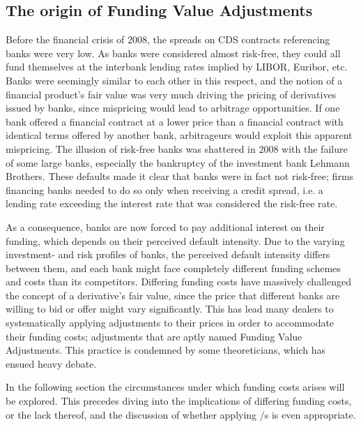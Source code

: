 \documentclass[main.tex]{subfiles}
\begin{document}
    \subsection{The origin of Funding Value Adjustments}
        Before the financial crisis of 2008, the spreads on CDS contracts referencing banks were very low. 
        As banks were considered almost risk-free, 
        they could all fund themselves at the interbank lending rates implied by LIBOR, Euribor, etc.
        Banks were seemingly similar to each other in this respect, 
        and the notion of a financial product's fair value was very much driving the pricing of derivatives issued by banks,
        since mispricing would lead to arbitrage opportunities.
        If one bank offered a financial contract at a lower price than a financial contract with identical terms
        offered by another bank, arbitrageurs would exploit this apparent mispricing. 
        The illusion of risk-free banks was shattered in 2008 with the failure of some large banks, 
        especially the bankruptcy of the investment bank Lehmann Brothers.
        These defaults made it clear that banks were in fact not risk-free; 
        firms financing banks needed to do so only when receiving a credit spread,
        i.e. a lending rate exceeding the interest rate that was considered the risk-free rate. 
        
        As a consequence, banks are now forced to pay additional interest on their funding, 
        which depends on their perceived default intensity.
        Due to the varying investment- and risk profiles of banks, 
        the perceived default intensity differs between them, 
        and each bank might face completely different funding schemes and costs than its competitors.
        Differing funding costs have massively challenged the concept of a derivative's fair value,
        since the price that different banks are willing to bid or offer might vary significantly. 
        This has lead many dealers to systematically applying adjustments to their prices
        in order to accommodate their funding costs; 
        adjustments that are aptly named Funding Value Adjustments. 
        This practice is condemned by some theoreticians, 
        which has ensued heavy debate.
        
        In the following section the circumstances under which funding costs arises will be explored.
        This precedes diving into the implications of differing funding costs, or the lack thereof,
        and the discussion of whether applying \FVA/s is even appropriate.
\end{document}
